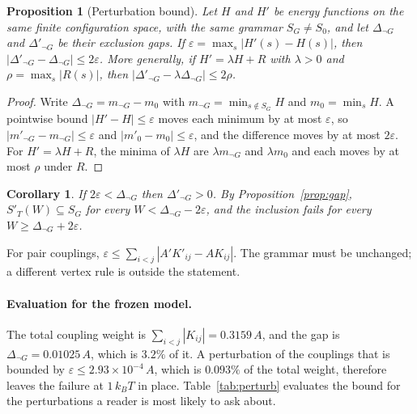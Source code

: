 \documentclass[11pt,a4paper]{article}
\theoremstyle{plain}
\newtheorem{proposition}[theorem]{Proposition}
\newtheorem{corollary}[theorem]{Corollary}
\theoremstyle{definition}
\theoremstyle{remark}
\newcommand{\SG}{S_{G}}
\newcommand{\Sz}{S_{0}}
\newcommand{\dnG}{\Delta_{\neg G}}
\newcommand{\kBT}{k_{B}T}
\begin{document}
\begin{proposition}[Perturbation bound]\label{prop:perturb}
Let $H$ and $H'$ be energy functions on the same finite configuration space, with the same grammar $\SG\ne\Sz$, and let $\Delta_{\neg G}$ and $\Delta'_{\neg G}$ be their exclusion gaps. If $\varepsilon=\max_s|H'(s)-H(s)|$, then $|\Delta'_{\neg G}-\Delta_{\neg G}|\le2\varepsilon$. More generally, if $H'=\lambda H+R$ with $\lambda>0$ and $\rho=\max_s|R(s)|$, then $|\Delta'_{\neg G}-\lambda\Delta_{\neg G}|\le2\rho$.
\end{proposition}
\begin{proof}
Write $\Delta_{\neg G}=m_{\neg G}-m_{0}$ with $m_{\neg G}=\min_{s\notin\SG}H$ and $m_0=\min_sH$. A pointwise bound $|H'-H|\le\varepsilon$ moves each minimum by at most $\varepsilon$, so $|m'_{\neg G}-m_{\neg G}|\le\varepsilon$ and $|m'_0-m_0|\le\varepsilon$, and the difference moves by at most $2\varepsilon$. For $H'=\lambda H+R$, the minima of $\lambda H$ are $\lambda m_{\neg G}$ and $\lambda m_0$ and each moves by at most $\rho$ under $R$.
\end{proof}
\begin{corollary}
If $2\varepsilon<\Delta_{\neg G}$ then $\Delta'_{\neg G}>0$. By Proposition~\ref{prop:gap}, $S'_T(W)\subseteq\SG$ for every $W<\Delta_{\neg G}-2\varepsilon$, and the inclusion fails for every $W\ge\Delta_{\neg G}+2\varepsilon$.
\end{corollary}
For pair couplings, $\varepsilon\le\sum_{i<j}|A'K'_{ij}-AK_{ij}|$. The grammar must be unchanged; a different vertex rule is outside the statement.

\paragraph{Evaluation for the frozen model.} The total coupling weight is $\sum_{i<j}|K_{ij}|=0.3159\,A$, and the gap is $\dnG=0.01025\,A$, which is $3.2\%$ of it. A perturbation of the couplings that is bounded by $\varepsilon\le2.93\times10^{-4}\,A$, which is $0.093\%$ of the total weight, therefore leaves the failure at $1\,\kBT$ in place. Table~\ref{tab:perturb} evaluates the bound for the perturbations a reader is most likely to ask about.
\end{document}
